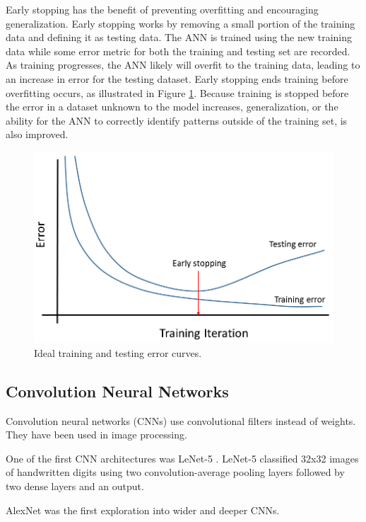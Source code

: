 Early stopping has the benefit of preventing overfitting and encouraging generalization. Early stopping works by removing a small portion of the training data and defining it as testing data. The ANN is trained using the new training data while some error metric for both the training and testing set are recorded. As training progresses, the ANN likely will overfit to the training data, leading to an increase in error for the testing dataset. Early stopping ends training before overfitting occurs, as illustrated in Figure \ref{fig:training_testing_error}. Because training is stopped before the error in a dataset unknown to the model increases, generalization, or the ability for the ANN to correctly identify patterns outside of the training set, is also improved.

\begin{figure}[H]
	\centering
	\includegraphics[width=0.85\linewidth]{images/training_testing_error_v2}
	\caption{Ideal training and testing error curves.}
	\label{fig:training_testing_error}
\end{figure}

\subsection{Convolution Neural Networks}

Convolution neural networks (CNNs) use convolutional filters instead of weights. They have been used in image processing. 

One of the first CNN architectures was LeNet-5 \cite{Lecun1998}. LeNet-5 classified 32x32 images of handwritten digits using two convolution-average pooling layers followed by two dense layers and an output. 

AlexNet \cite{Krizhevsky2012} was the first exploration into wider and deeper CNNs. 

